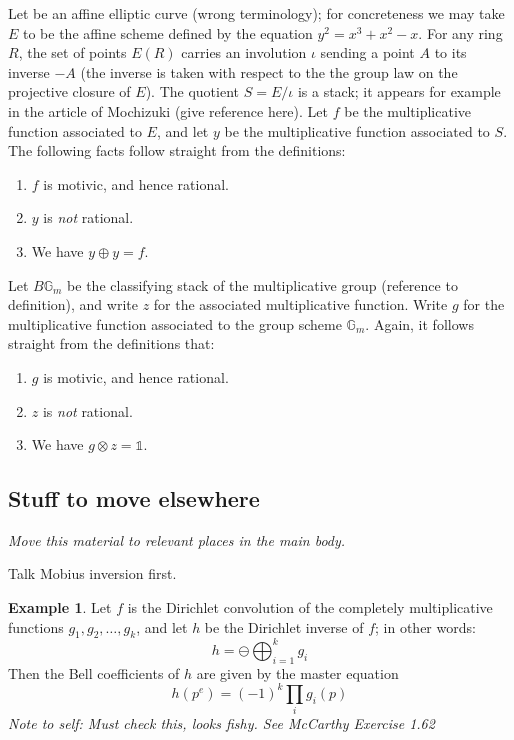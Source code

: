 \documentclass[a4paper]{article}
\theoremstyle{definition}
\newtheorem{example}{Example}[section]
\theoremstyle{remark}
\begin{document}
Let be an affine elliptic curve (wrong terminology); for concreteness we may take $E$ to be the affine scheme defined by the equation $y^2 = x^3 + x^2 - x$. For any ring $R$, the set of points $E(R)$ carries an involution $\iota$ sending a point $A$ to its inverse $-A$ (the inverse is taken with respect to the the group law on the projective closure of $E$). The quotient $S = E/ \iota$ is a stack; it appears for example in the article of Mochizuki (give reference here). Let $f$ be the multiplicative function associated to $E$, and let $y$ be the multiplicative function associated to $S$. The following facts follow straight from the definitions:
\begin{enumerate}
\item $f$ is motivic, and hence rational.
\item $y$ is \emph{not} rational.
\item We have $y \oplus y = f$. 
\end{enumerate}

Let $B \mathbb{G}_m$ be the classifying stack of the multiplicative group (reference to definition), and write $z$ for the associated multiplicative function. Write $g$ for the multiplicative function associated to the group scheme $\mathbb{G}_m$. Again, it follows straight from the definitions that:
\begin{enumerate}
\item $g$ is motivic, and hence rational.
\item $z$ is \emph{not} rational.
\item We have $g \otimes z = \mathbb{1}$. 
\end{enumerate}



\subsection*{Stuff to move elsewhere}

\emph{Move this material to relevant places in the main body.}

Talk Mobius inversion first.

\begin{example}
Let $f$ is the Dirichlet convolution of the completely multiplicative functions $g_1, g_2, \ldots, g_k$, and let $h$ be the Dirichlet inverse of $f$; in other words:
$$  h = \ominus \bigoplus_{i=1}^k g_i  $$
Then the Bell coefficients of $h$ are given by the master equation
$$  h(p^e) = (-1)^k \prod_i g_i(p)  $$
\emph{Note to self: Must check this, looks fishy. See McCarthy Exercise 1.62}

\end{example}
\end{document}
